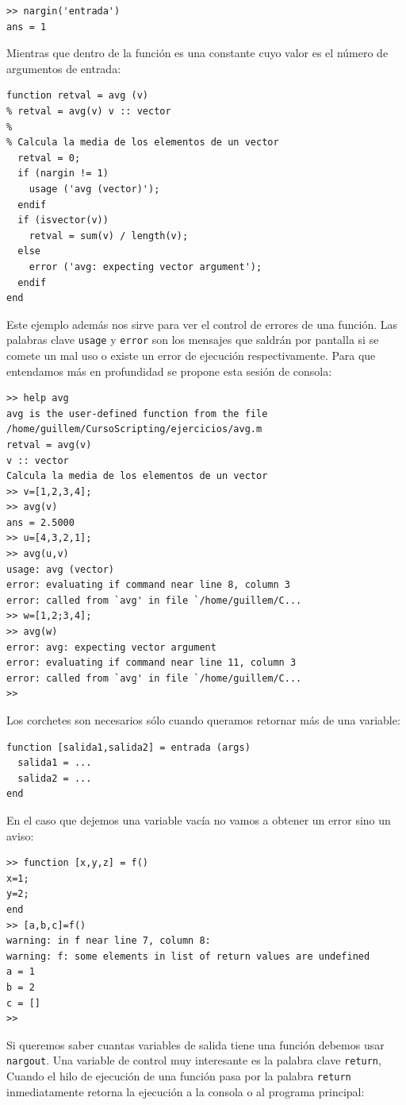 \begin{verbatim}
>> nargin('entrada')
ans = 1
\end{verbatim}
Mientras que dentro de la función es una constante cuyo valor es el
número de argumentos de entrada:

\begin{verbatim}
function retval = avg (v)
% retval = avg(v) v :: vector
%
% Calcula la media de los elementos de un vector
  retval = 0;
  if (nargin != 1)
    usage ('avg (vector)');
  endif
  if (isvector(v))
    retval = sum(v) / length(v);
  else
    error ('avg: expecting vector argument');
  endif
end
\end{verbatim}
Este ejemplo además nos sirve para ver el control de errores de una
función. Las palabras clave \texttt{usage} y
\texttt{error} son los mensajes que saldrán por pantalla
si se comete un mal uso o existe un error de ejecución
respectivamente. Para que entendamos más en profundidad se propone
esta sesión de consola:

\begin{verbatim}
>> help avg
avg is the user-defined function from the file
/home/guillem/CursoScripting/ejercicios/avg.m   
retval = avg(v)
v :: vector
Calcula la media de los elementos de un vector   
>> v=[1,2,3,4];
>> avg(v)
ans = 2.5000
>> u=[4,3,2,1];
>> avg(u,v)
usage: avg (vector)
error: evaluating if command near line 8, column 3
error: called from `avg' in file `/home/guillem/C...
>> w=[1,2;3,4];
>> avg(w)
error: avg: expecting vector argument
error: evaluating if command near line 11, column 3
error: called from `avg' in file `/home/guillem/C...
>>
\end{verbatim}
Los corchetes son necesarios sólo cuando queramos retornar más de una
variable:
\begin{verbatim}
function [salida1,salida2] = entrada (args)
  salida1 = ...
  salida2 = ...
end
\end{verbatim}
En el caso que dejemos una variable vacía no vamos a obtener un error
sino un aviso:

\begin{verbatim}
>> function [x,y,z] = f()
x=1;
y=2;
end
>> [a,b,c]=f()
warning: in f near line 7, column 8:
warning: f: some elements in list of return values are undefined
a = 1
b = 2
c = []
>>                 
\end{verbatim}
Si queremos saber cuantas variables de salida tiene una función
debemos usar \texttt{nargout}. Una variable de control
muy interesante es la palabra clave \texttt{return},
Cuando el hilo de ejecución de una función pasa por la palabra
\texttt{return} inmediatamente retorna la ejecución a la consola o al
programa principal:

